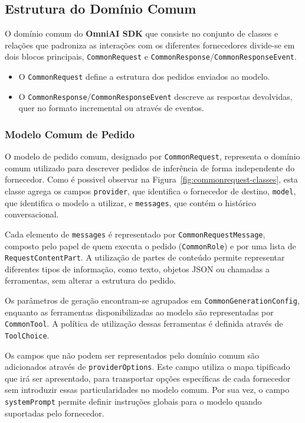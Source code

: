     \subsection{{Estrutura do Domínio Comum}}
    O domínio comum do \textbf{OmniAI SDK} que consiste no conjunto de classes e relações que padroniza as interações com os diferentes fornecedores divide-se em dois blocos principais, \texttt{CommonRequest} e \texttt{CommonResponse}/\allowbreak\texttt{CommonResponseEvent}.

    \begin{itemize}
        \item O \texttt{CommonRequest} define a estrutura dos pedidos enviados ao modelo.
        \item O \texttt{CommonResponse}/\texttt{CommonResponseEvent} descreve as respostas devolvidas, quer no formato incremental ou através de eventos.
    \end{itemize}

    \subsubsection{{Modelo Comum de Pedido}}
O modelo de pedido comum, designado por \texttt{CommonRequest}, representa o domínio comum utilizado para descrever pedidos de inferência de forma independente do fornecedor. Como é possivel observar na Figura~\ref{fig:commonrequest-classes}, esta classe agrega os campos \texttt{provider}, que identifica o fornecedor de destino, \texttt{model}, que identifica o modelo a utilizar, e \texttt{messages}, que contém o histórico conversacional.

Cada elemento de \texttt{messages} é representado por \texttt{CommonRequestMessage}, composto pelo papel de quem executa o pedido (\texttt{CommonRole}) e por uma lista de \texttt{RequestContentPart}. A utilização de partes de conteúdo permite representar diferentes tipos de informação, como texto, objetos JSON ou chamadas a ferramentas, sem alterar a estrutura do pedido.

Os parâmetros de geração encontram-se agrupados em \texttt{CommonGenerationConfig}, enquanto as ferramentas disponibilizadas ao modelo são representadas por \texttt{CommonTool}. A política de utilização dessas ferramentas é definida através de \texttt{ToolChoice}.

Os campos que não podem ser representados pelo domínio comum são adicionados através de \texttt{provider\allowbreak Options}. Este campo utiliza o mapa tipificado que irá ser apresentado, para transportar opções específicas de cada fornecedor sem introduzir essas particularidades no modelo comum. Por sua vez, o campo \texttt{systemPrompt} permite definir instruções globais para o modelo quando suportadas pelo fornecedor.

